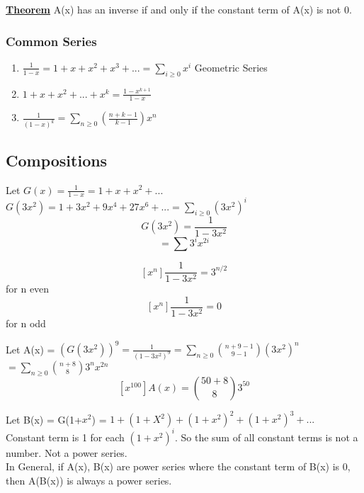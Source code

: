 \documentclass[12pt]{article}
\newcommand{\myt}[1]{\textbf{\underline{#1}}}
\begin{document}
	\myt{Theorem} A(x) has an inverse if and only if the constant term of A(x) is not 0.\\
	
	\subsubsection*{Common Series}
	\begin{enumerate}
		\item $\frac{1}{1-x} = 1 + x + x^2 + x^3 + ... = \sum_{i \geq 0}x^i$ Geometric Series
		\item $1 + x + x^2 + ... + x^k = \frac{1-x^{k+1}}{1-x}$\\
		\item $\frac{1}{(1-x)^k} = \sum_{n \geq 0}(\frac{n+k-1}{k-1})x^n$
	\end{enumerate}
	
	\subsection*{Compositions}
	
	Let $G(x) = \frac{1}{1-x} = 1 + x + x^2 + ...$\\
	$G(3x^2) = 1 + 3x^2 + 9x^4 + 27x^6 + ... = \sum_{i \geq 0}(3x^2)^i$\\
	
	$$G(3x^2) = \frac{1}{1-3x^2}$$
	$$= \sum3^ix^{2i}$$
	
	$$[x^n]\frac{1}{1-3x^2} = 3^{n/2}$$
	for n even
	$$[x^n]\frac{1}{1-3x^2} = 0$$
	for n odd
	
	Let A(x) = $(G(3x^2))^9 = \frac{1}{(1-3x^2)^9} = \sum_{n \geq 0}{n+9 - 1 \choose 9-1}(3x^2)^n$
	$= \sum_{n \geq 0}{n+8 \choose 8}3^nx^{2n}$
	$$[x^100]A(x) = {50+8 \choose 8}3^{50}$$
	
	Let B(x) = G(1+$x^2$) = $1 + (1+X^2) + (1+x^2)^2 + (1+x^2)^3 + ...$\\
	Constant term is 1 for each $(1+x^2)^i$. So the sum of all constant terms is not a number. Not a power series.\\
	
	In General, if A(x), B(x) are power series where the constant term of B(x) is 0, then A(B(x)) is always a power series.\\
	
	
	
\end{document}
